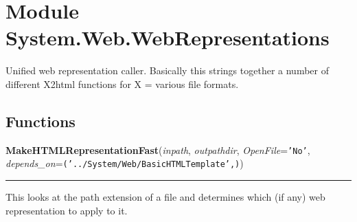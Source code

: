 %
%
%


\section{Module System.Web.WebRepresentations}

    \label{System:Web:WebRepresentations}
Unified web representation caller.  Basically this strings together a 
number of different X2html functions for X = various file formats.



  \subsection{Functions}

    \label{System:Web:WebRepresentations:MakeHTMLRepresentationFast}

    \vspace{0.5ex}

\hspace{.8\funcindent}\begin{boxedminipage}{\funcwidth}

    \raggedright \textbf{MakeHTMLRepresentationFast}(\textit{inpath}, \textit{outpathdir}, \textit{OpenFile}={\tt 'No'}, \textit{depends\_on}={\tt ('../System/Web/BasicHTMLTemplate',)})

    \vspace{-1.5ex}

    \rule{\textwidth}{0.5\fboxrule}
\setlength{\parskip}{2ex}
    This looks at the path extension of a file and determines which (if 
    any) web representation to apply to it.

\setlength{\parskip}{1ex}
    \end{boxedminipage}

